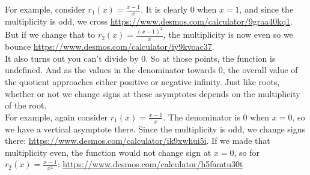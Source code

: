 \documentclass[10pt]{article}
\theoremstyle{definition}
\begin{document}
For example, consider $r_1(x)=\frac{x-1}{x}$.  It is clearly 0 when $x=1$, and since the multiplicity is odd, we cross \url{https://www.desmos.com/calculator/9graa40kq1}.  But if we change that to $r_2(x)=\frac{(x-1)^2}{x}$, the multiplicity is now even so we bounce \url{https://www.desmos.com/calculator/iy9kvoac37}.\\

It also turns out you can't divide by 0.  So at those points, the function is undefined.  And as the values in the denominator towards 0, the overall value of the quotient approaches either positive or negative infinity.  Just like roots, whether or not we change signs at these asymptotes depends on the multiplicity of the root.\\




For example, again consider $r_1(x)=\frac{x-1}{x}$.  The denominator is 0 when $x=0$, so we have a vertical asymptote there.  Since the multiplicity is odd, we change signs there: \url{https://www.desmos.com/calculator/ik9xwhui5i}.  If we made that multiplicity even, the function would not change sign at $x=0$, so for $r_2(x)=\frac{x-1}{x^2}$: \url{https://www.desmos.com/calculator/h5famtu30t}
\end{document}
